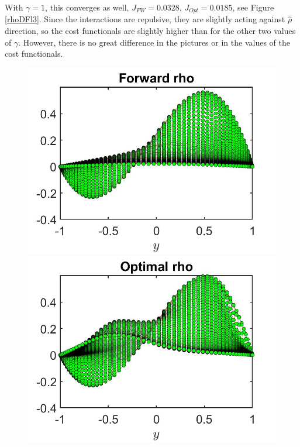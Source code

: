 \documentclass[11pt, a4paper]{article}
\theoremstyle{definition}
\begin{document}
With $\gamma = 1$, this converges as well, $J_{FW} = 0.0328$, $J_{Opt} = 0.0185$, see Figure \ref{rhoDFl3}. Since the interactions are repulsive, they are slightly acting against $\hat \rho$ direction, so the cost functionals are slightly higher than for the other two values of $\gamma$. However, there is no great difference in the pictures or in the values of the cost functionals.

\begin{figure}[h]
	\includegraphics[scale=0.3]{DFlrhoFW3.jpg}	
	\includegraphics[scale=0.3]{DFlrhoOpt3.jpg}

\end{figure}
\end{document}
